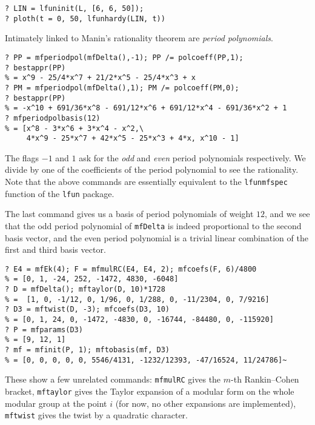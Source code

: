 \documentclass[11pt]{article}
\def\kbd#1{{\tt #1}}
\begin{document}
\begin{verbatim}
? LIN = lfuninit(L, [6, 6, 50]);
? ploth(t = 0, 50, lfunhardy(LIN, t))
\end{verbatim}


\medskip

Intimately linked to Manin's rationality theorem are \emph{period polynomials}.

\begin{verbatim}
? PP = mfperiodpol(mfDelta(),-1); PP /= polcoeff(PP,1);
? bestappr(PP)
% = x^9 - 25/4*x^7 + 21/2*x^5 - 25/4*x^3 + x
? PM = mfperiodpol(mfDelta(),1); PM /= polcoeff(PM,0);
? bestappr(PP)
% = -x^10 + 691/36*x^8 - 691/12*x^6 + 691/12*x^4 - 691/36*x^2 + 1
? mfperiodpolbasis(12)
% = [x^8 - 3*x^6 + 3*x^4 - x^2,\
     4*x^9 - 25*x^7 + 42*x^5 - 25*x^3 + 4*x, x^10 - 1]
\end{verbatim}

The flags $-1$ and $1$ ask for the \emph{odd} and \emph{even} period
polynomials respectively. We divide by one of the coefficients of the
period polynomial to see the rationality. Note that the above commands
are essentially equivalent to the \kbd{lfunmfspec} function of the
\kbd{lfun} package.

The last command gives us a basis of period polynomials of weight $12$, and
we see that the odd period polynomial of \kbd{mfDelta} is indeed proportional
to the second basis vector, and the even period polynomial is a trivial
linear combination of the first and third basis vector.

\medskip

\begin{verbatim}
? E4 = mfEk(4); F = mfmulRC(E4, E4, 2); mfcoefs(F, 6)/4800
% = [0, 1, -24, 252, -1472, 4830, -6048]
? D = mfDelta(); mftaylor(D, 10)*1728
% =  [1, 0, -1/12, 0, 1/96, 0, 1/288, 0, -11/2304, 0, 7/9216]
? D3 = mftwist(D, -3); mfcoefs(D3, 10)
% = [0, 1, 24, 0, -1472, -4830, 0, -16744, -84480, 0, -115920]
? P = mfparams(D3)
% = [9, 12, 1]
? mf = mfinit(P, 1); mftobasis(mf, D3)
% = [0, 0, 0, 0, 0, 5546/4131, -1232/12393, -47/16524, 11/24786]~
\end{verbatim}

These show a few unrelated commands: \kbd{mfmulRC} gives the $m$-th
Rankin--Cohen bracket, \kbd{mftaylor} gives the Taylor expansion of
a modular form on the whole modular group at the point $i$ (for now,
no other expansions are implemented), \kbd{mftwist} gives the twist
by a quadratic character.
\end{document}
